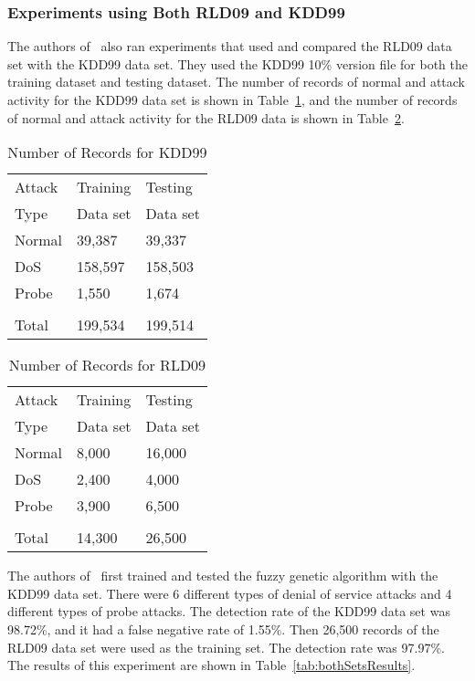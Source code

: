 \documentclass{sig-alternate}
\begin{document}
\subsubsection{Experiments using Both RLD09 and KDD99}
The authors of~\cite{6496342, 6559603} also ran experiments that used and compared the RLD09 data set with the KDD99 data set. They used the KDD99 10\% version file for both the training dataset and testing dataset. The number of records of normal and attack activity for the KDD99 data set is shown in Table~\ref{tab:RecordsForKDD99}, and the number of records of normal and attack activity for the RLD09 data is shown in Table~\ref{tab:RecordsForRLD09}.

\begin{table}
\caption{Number of Records for KDD99}
\begin{tabular}{|lll|} \hline
Attack & Training & Testing\\
Type   & Data set & Data set\\ \hline
Normal & 39,387 & 39,337\\
DoS & 158,597 & 158,503\\
Probe & 1,550 & 1,674\\
 & &\\
 Total & 199,534 & 199,514\\
\hline\end{tabular}
\label{tab:RecordsForKDD99}
\end{table}


\begin{table}
\caption{Number of Records for RLD09}
\begin{tabular}{|lll|} \hline
Attack & Training & Testing\\
Type   & Data set & Data set\\ \hline
Normal & 8,000 & 16,000\\
DoS & 2,400 & 4,000\\
Probe & 3,900 & 6,500\\
 & &\\
 Total & 14,300 & 26,500\\
\hline\end{tabular}
\label{tab:RecordsForRLD09}
\end{table}

The authors of~\cite{6496342, 6559603} first trained and tested the fuzzy genetic algorithm with the KDD99 data set. There were 6 different types of denial of service attacks and 4 different types of probe attacks. The detection rate of the KDD99 data set was 98.72\%, and it had a false negative rate of 1.55\%. Then 26,500 records of the RLD09 data set were used as the training set. The detection rate was 97.97\%. The results of this experiment are shown in Table~\ref{tab:bothSetsResults}.
\end{document}
